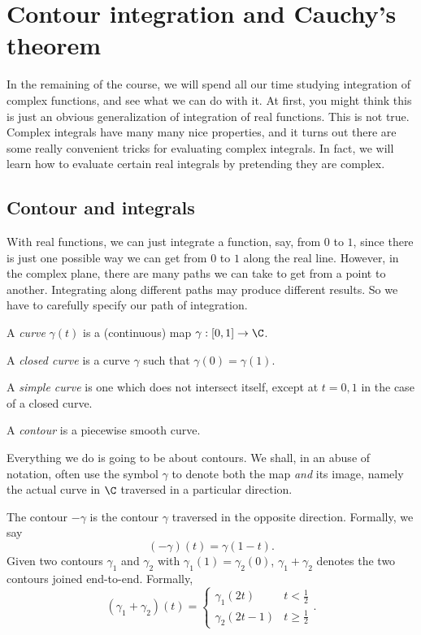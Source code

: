\documentclass[a4paper]{article}
\begin{document}
\section{Contour integration and Cauchy's theorem}
In the remaining of the course, we will spend all our time studying integration of complex functions, and see what we can do with it. At first, you might think this is just an obvious generalization of integration of real functions. This is not true. Complex integrals have many many nice properties, and it turns out there are some really convenient tricks for evaluating complex integrals. In fact, we will learn how to evaluate certain real integrals by pretending they are complex.

\subsection{Contour and integrals}
With real functions, we can just integrate a function, say, from $0$ to $1$, since there is just one possible way we can get from $0$ to $1$ along the real line. However, in the complex plane, there are many paths we can take to get from a point to another. Integrating along different paths may produce different results. So we have to carefully specify our path of integration.

\begin{defi}[Curve]
  A \emph{curve} $\gamma(t)$ is a (continuous) map $\gamma: [0, 1] \to \C$.
\end{defi}

\begin{defi}
  A \emph{closed curve} is a curve $\gamma$ such that $\gamma(0) = \gamma(1)$.
\end{defi}

\begin{defi}
  A \emph{simple curve} is one which does not intersect itself, except at $t = 0, 1$ in the case of a closed curve.
\end{defi}

\begin{defi}[Contour]
  A \emph{contour} is a piecewise smooth curve.
\end{defi}
Everything we do is going to be about contours. We shall, in an abuse of notation, often use the symbol $\gamma$ to denote both the map \emph{and} its image, namely the actual curve in $\C$ traversed in a particular direction.

\begin{notation}
  The contour $-\gamma$ is the contour $\gamma$ traversed in the opposite direction. Formally, we say
  \[
    (-\gamma)(t) = \gamma(1 - t).
  \]
  Given two contours $\gamma_1$ and $\gamma_2$ with $\gamma_1(1) = \gamma_2(0)$, $\gamma_1 + \gamma_2$ denotes the two contours joined end-to-end. Formally,
  \[
    (\gamma_1 + \gamma_2)(t) =
    \begin{cases}
      \gamma_1(2t) & t < \frac{1}{2}\\
      \gamma_2(2t - 1) & t \geq \frac{1}{2}
    \end{cases}.
  \]
\end{notation}
\end{document}
